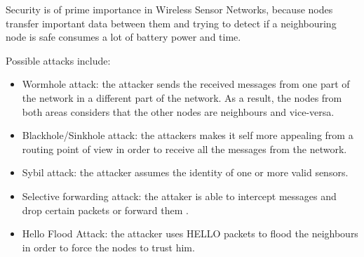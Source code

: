 Security is of prime importance in Wireless Sensor Networks, because nodes transfer important data between them and trying to detect if a neighbouring node is safe consumes a lot of battery power and time.

Possible attacks include:
\begin{itemize}

\item Wormhole attack: the attacker sends the received messages from one part of the network in a different part of the network. As a result, the nodes from both areas considers that the other nodes are neighbours and vice-versa.
\item Blackhole/Sinkhole attack: the attackers makes it self more appealing from a routing point of view in order to receive all the messages from the network.
\item Sybil attack: the attacker assumes the identity of one or more valid sensors\cite{newsome2004sybil}.
\item Selective forwarding attack: the attaker is able to intercept messages and drop certain packets or forward them \cite{kaplantzis2007detecting}.
\item Hello Flood Attack: the attacker uses HELLO packets to flood the neighbours in order to force the nodes to trust him.

\end{itemize}

